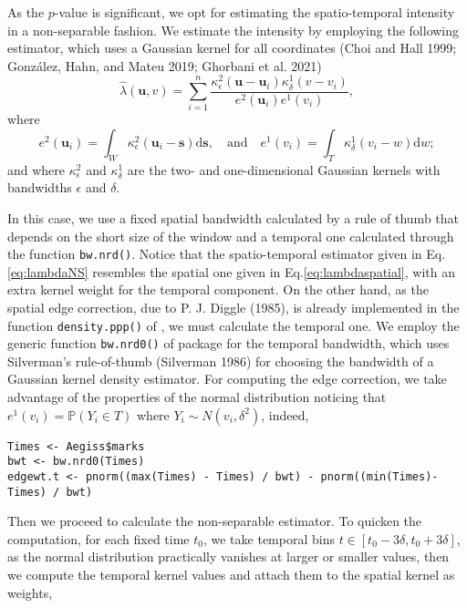 As the \(p\)-value is significant, we opt for estimating the spatio-temporal intensity in a non-separable fashion. We estimate the intensity by employing the following estimator, which uses a Gaussian kernel for all coordinates (Choi and Hall 1999; González, Hahn, and Mateu 2019; Ghorbani et al. 2021)
\begin{equation}
    \hat{\lambda}(\mathbf{u},v)=\sum_{i=1}^{n}\frac{\kappa_{\epsilon}^{2}(\mathbf{u}-\mathbf{u}_i)\kappa_{\delta}^{1}(v-v_i)}{e^2(\mathbf{u}_i)e^1(v_i)},
    \label{eq:lambdaNS}
\end{equation}
where
\[
e^2(\mathbf{u}_i)=\int_{W} \kappa_{\epsilon}^{2}(\mathbf{u}_i-\mathbf{s})\text{d} \mathbf{s}, \quad \text{and}\quad e^1(v_i)=\int_{T} \kappa_{\delta}^{1}(v_i-w)\text{d} w;
\]
and where \(\kappa_{\epsilon}^{2}\) and \(\kappa_{\delta}^{1}\) are the two- and one-dimensional Gaussian kernels with bandwidths \(\epsilon\) and \(\delta\).

In this case, we use a fixed spatial bandwidth calculated by a rule of thumb that depends on the short size of the window and a temporal one calculated through the function \texttt{bw.nrd()}. Notice that the spatio-temporal estimator given in Eq.\eqref{eq:lambdaNS} resembles the spatial one given in Eq.\eqref{eq:lambdaspatial}, with an extra kernel weight for the temporal component. On the other hand, as the spatial edge correction, due to P. J. Diggle (1985), is already implemented in the function \texttt{density.ppp()} of , we must calculate the temporal one. We employ the generic function \texttt{bw.nrd0()} of package  for the temporal bandwidth, which uses Silverman's rule-of-thumb (Silverman 1986) for choosing the bandwidth of a Gaussian kernel density estimator. For computing the edge correction, we take advantage of the properties of the normal distribution noticing that \(e^1(v_i)=\mathbb{P}(Y_i \in T)\) where \(Y_i \sim N(v_i, \delta^2)\), indeed,

\begin{verbatim}
Times <- Aegiss$marks
bwt <- bw.nrd0(Times)
edgewt.t <- pnorm((max(Times) - Times) / bwt) - pnorm((min(Times)- Times) / bwt) 
\end{verbatim}

Then we proceed to calculate the non-separable estimator. To quicken the computation, for each fixed time \(t_0\), we take temporal bins \(t\in [t_0-3\delta, t_0+3\delta]\), as the normal distribution practically vanishes at larger or smaller values, then we compute the temporal kernel values and attach them to the spatial kernel as weights,

